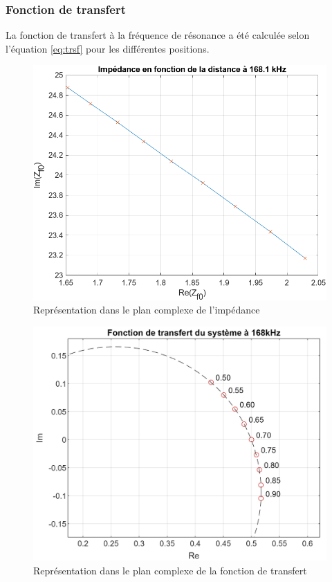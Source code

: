 \subsubsection{Fonction de transfert}
La fonction de transfert à la fréquence de résonance a été calculée selon l'équation \ref{eq:trsf}
pour les différentes positions.
\begin{figure}[H]
    \centering
    \includegraphics[width=15cm]{Images/Seance2/impedance_complexe_168.png}
    \caption{Représentation dans le plan complexe de l'impédance}
    \label{fig:impe}
\end{figure}

\begin{figure}[H]
    \centering
    \includegraphics[width=15cm]{Images/Seance2/Transfert_mobius.jpg}
    \caption{Représentation dans le plan complexe de la fonction de transfert}
    \label{fig:transf}
\end{figure}

